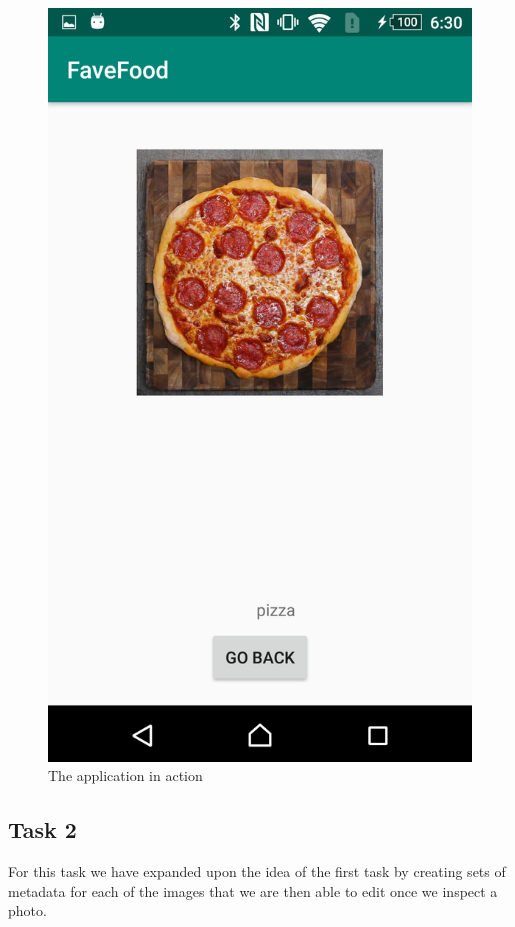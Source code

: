 \documentclass{scrartcl}
\begin{document}
\begin{figure}[h]
    \includegraphics[scale=0.15]{images/screen6.png}
    \caption{The application in action}
\end{figure}

\pagebreak

\subsection*{Task 2}
For this task we have expanded upon the idea of the first task by creating sets of metadata for each
of the images that we are then able to edit once we inspect a photo.
\end{document}
